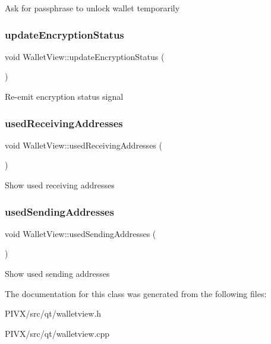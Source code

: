 Ask for passphrase to unlock wallet temporarily \mbox{\label{class_wallet_view_ad348f2ed9f843ef9125ca416307c7412}} 
\subsubsection{\texorpdfstring{update\+Encryption\+Status}{updateEncryptionStatus}}
{\footnotesize\ttfamily void Wallet\+View\+::update\+Encryption\+Status (\begin{DoxyParamCaption}{ }\end{DoxyParamCaption})\hspace{0.3cm}{\ttfamily [slot]}}

Re-\/emit encryption status signal \mbox{\label{class_wallet_view_accb5d9e2789c62e03ad1723518d31c02}} 
\subsubsection{\texorpdfstring{used\+Receiving\+Addresses}{usedReceivingAddresses}}
{\footnotesize\ttfamily void Wallet\+View\+::used\+Receiving\+Addresses (\begin{DoxyParamCaption}{ }\end{DoxyParamCaption})\hspace{0.3cm}{\ttfamily [slot]}}

Show used receiving addresses \mbox{\label{class_wallet_view_a6f0d012c18ea2df7336c852abe2a50d0}} 
\subsubsection{\texorpdfstring{used\+Sending\+Addresses}{usedSendingAddresses}}
{\footnotesize\ttfamily void Wallet\+View\+::used\+Sending\+Addresses (\begin{DoxyParamCaption}{ }\end{DoxyParamCaption})\hspace{0.3cm}{\ttfamily [slot]}}

Show used sending addresses 

The documentation for this class was generated from the following files\+:\begin{DoxyCompactItemize}
\item 
P\+I\+V\+X/src/qt/walletview.\+h\item 
P\+I\+V\+X/src/qt/walletview.\+cpp\end{DoxyCompactItemize}
